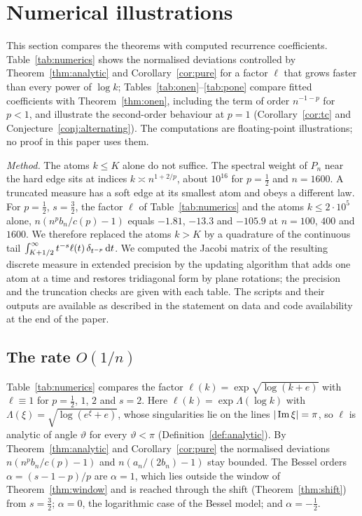 
\section{Numerical illustrations}\label{sec:numerics}

This section compares the theorems with computed recurrence coefficients. Table~\ref{tab:numerics} shows the normalised
deviations controlled by Theorem~\ref{thm:analytic} and Corollary~\ref{cor:pure} for a factor $\ell$ that grows faster
than every power of $\log k$; Tables~\ref{tab:onen}--\ref{tab:pone} compare fitted coefficients with
Theorem~\ref{thm:onen}, including the term of order $n^{-1-p}$ for $p<1$, and illustrate the second-order behaviour at
$p=1$ (Corollary~\ref{cor:tc} and Conjecture~\ref{conj:alternating}). The computations are floating-point
illustrations; no proof in this paper uses them.

\emph{Method.} The atoms $k\le K$ alone do not suffice. The spectral weight of $P_n$ near the hard edge sits at indices
$k\asymp n^{1+2/p}$, about $10^{16}$ for $p=\frac12$ and $n=1600$. A truncated measure has a soft edge at its
smallest atom and obeys a different law. For $p=\frac12$, $s=\frac32$, the factor $\ell$ of Table~\ref{tab:numerics} and
the atoms $k\le2\cdot10^5$ alone, $n(n^pb_n/c(p)-1)$ equals $-1.81$, $-13.3$ and $-105.9$ at $n=100$, $400$ and $1600$.
We therefore replaced the atoms $k>K$ by a quadrature of the continuous tail $\int_{K+1/2}^{\infty}t^{-s}\ell(t)\,
\delta_{t^{-p}}\,\mathrm{d} t$. We computed the Jacobi matrix of the resulting discrete measure in extended precision by the
updating algorithm that adds one atom at a time and restores tridiagonal form by plane rotations; the precision and the
truncation checks are given with each table. The scripts and their outputs are available as described in the statement
on data and code availability at the end of the paper.

\subsection{\texorpdfstring{The rate $O(1/n)$}{The rate O(1/n)}}
Table~\ref{tab:numerics} compares the factor $\ell(k)=\exp\sqrt{\log(k+e)}$ with $\ell\equiv1$ for $p=\frac12$, $1$, $2$
and $s=2$. Here $\ell(k)=\exp\Lambda(\log k)$ with $\Lambda(\xi)=\sqrt{\log(e^\xi+e)}$, whose singularities lie on the
lines $|\operatorname{Im}\xi|=\pi$, so $\ell$ is analytic of angle $\vartheta$ for every $\vartheta<\pi$
(Definition~\ref{def:analytic}). By Theorem~\ref{thm:analytic} and Corollary~\ref{cor:pure} the normalised deviations
$n(n^pb_n/c(p)-1)$ and $n(a_n/(2b_n)-1)$ stay bounded. The Bessel orders $\alpha=(s-1-p)/p$ are $\alpha=1$, which lies
outside the window of Theorem~\ref{thm:window} and is reached through the shift (Theorem~\ref{thm:shift}) from
$s=\frac32$; $\alpha=0$, the logarithmic case of the Bessel model; and $\alpha=-\frac12$.

